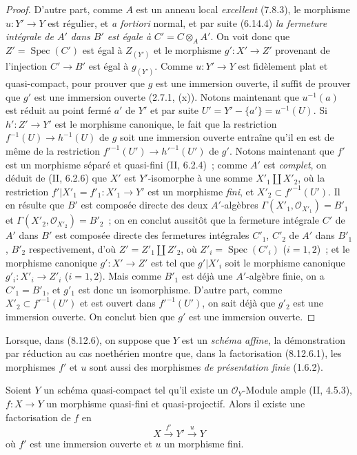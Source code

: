 \begin{proof}
D'autre part, comme $A$ est un anneau local \emph{excellent} (7.8.3), le
morphisme $u:Y'\to Y$ est régulier, et \emph{a fortiori} normal, et par suite
(6.14.4) \emph{la fermeture intégrale de $A'$ dans $B'$ est égale à}
$C'=C\otimes_A A'$. On voit donc que $Z'=\operatorname{Spec}(C')$ est égal à
$Z_{(Y')}$ et le morphisme $g':X'\to Z'$ provenant de l'injection $C'\to B'$
est égal à $g_{(Y')}$. Comme $u:Y'\to Y$ est fidèlement plat et
quasi-compact, pour prouver que $g$ est une immersion ouverte, il suffit de
prouver que $g'$ est une immersion ouverte (2.7.1, (x)). Notons maintenant
que $u^{-1}(a)$ est réduit au point fermé $a'$ de $Y'$ et par suite
$U'=Y'-\{a'\}=u^{-1}(U)$. Si $h':Z'\to Y'$ est le morphisme canonique, le
fait que la restriction $f^{-1}(U)\to h^{-1}(U)$ de $g$ soit une immersion
ouverte entraîne qu'il en est de même de la restriction
$f'^{-1}(U')\to h'^{-1}(U')$ de $g'$. Notons maintenant que $f'$ est un
morphisme séparé et quasi-fini (II, 6.2.4)~; comme $A'$ est \emph{complet},
on déduit de (II, 6.2.6) que $X'$ est $Y'$-isomorphe à une somme
$X'_1\amalg X'_2$, où la restriction
$f'|X'_1=f'_1:X'_1\to Y'$ est un morphisme \emph{fini}, et
$X'_2\subset f'^{-1}(U')$. Il en résulte que $B'$ est composée directe des
deux $A'$-algèbres
$\Gamma(X'_1,\mathcal O_{X'_1})=B'_1$ et
$\Gamma(X'_2,\mathcal O_{X'_2})=B'_2$~; on en conclut aussitôt que la
fermeture intégrale $C'$ de $A'$ dans $B'$ est composée directe des
fermetures intégrales $C'_1$, $C'_2$ de $A'$ dans $B'_1$, $B'_2$
respectivement, d'où $Z'=Z'_1\amalg Z'_2$, où
$Z'_i=\operatorname{Spec}(C'_i)$ ($i=1,2$)~; et le morphisme canonique
$g':X'\to Z'$ est tel que $g'|X'_i$ soit le morphisme canonique
$g'_i:X'_i\to Z'_i$ ($i=1,2$). Mais comme $B'_1$ est déjà une
$A'$-algèbre finie, on a $C'_1=B'_1$, et $g'_1$ est donc un isomorphisme.
D'autre part, comme $X'_2\subset f'^{-1}(U')$ et est ouvert dans
$f'^{-1}(U')$, on sait
déjà que $g'_2$ est une immersion ouverte. On conclut bien que $g'$ est une
immersion ouverte.
\end{proof}

\begin{remark}[8.12.7]
\label{IV.8.12.7-fr}
Lorsque, dans (8.12.6), on suppose que $Y$ est un \emph{schéma affine}, la
démonstration par réduction au cas noethérien montre que, dans la
factorisation (8.12.6.1), les morphismes $f'$ et $u$ sont aussi des
morphismes \emph{de présentation finie} (1.6.2).
\end{remark}

\begin{corollary}[8.12.8]
\label{IV.8.12.8-fr}
Soient $Y$ un schéma quasi-compact tel qu'il existe un $\mathcal O_Y$-Module
ample (II, 4.5.3), $f:X\to Y$ un morphisme quasi-fini et quasi-projectif.
Alors il existe une factorisation de $f$ en
\[
X\xrightarrow{f'}Y'\xrightarrow{u}Y
\]
où $f'$ est une immersion ouverte et $u$ un morphisme fini.
\end{corollary}

